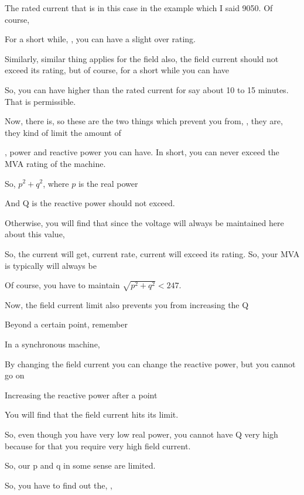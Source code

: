 \documentclass{article}
\begin{document}
The rated current that is in this case in the example which I said 9050. Of course,

For a short while, , you can have a slight over rating.

Similarly, similar thing applies for the field also, the field current should not exceed its rating, but of course, for a short while you can have

So, you can have higher than the rated current for say about 10 to 15 minutes. That is permissible.

Now, there is, so these are the two things which prevent you from, , they are, they kind of limit the amount of

, power and reactive power you can have. In short, you can never exceed the MVA rating of the machine.

So, $p^2 + q^2$, where $p$ is the real power

And Q is the reactive power should not exceed.

Otherwise, you will find that since the voltage will always be maintained here about this value,

So, the current will get, current rate, current will exceed its rating. So, your MVA is typically will always be

Of course, you have to maintain $\sqrt{p^2 + q^2} < 247$.

Now, the field current limit also prevents you from increasing the Q

Beyond a certain point, remember

In a synchronous machine,

By changing the field current you can change the reactive power, but you cannot go on

Increasing the reactive power after a point

You will find that the field current hits its limit.

So, even though you have very low real power, you cannot have Q very high because for that you require very high field current.

So, our p and q in some sense are limited.

So, you have to find out the, ,
\end{document}
